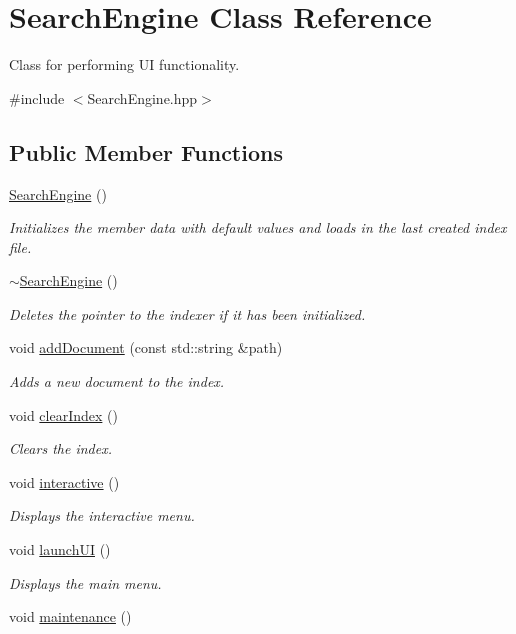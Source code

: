 \hypertarget{class_search_engine}{}\section{Search\+Engine Class Reference}
\label{class_search_engine}


Class for performing U\+I functionality.  




{\ttfamily \#include $<$Search\+Engine.\+hpp$>$}

\subsection*{Public Member Functions}
\begin{DoxyCompactItemize}
\item 
\hyperlink{class_search_engine_ab129d2c96c29c6dcf4a28abbe4168f6c}{Search\+Engine} ()
\begin{DoxyCompactList}\small\item\em Initializes the member data with default values and loads in the last created index file. \end{DoxyCompactList}\item 
\hyperlink{class_search_engine_a863ab87efd742b9a8f20b87774ab570f}{$\sim$\+Search\+Engine} ()
\begin{DoxyCompactList}\small\item\em Deletes the pointer to the indexer if it has been initialized. \end{DoxyCompactList}\item 
void \hyperlink{class_search_engine_a9ea46878a950ecad2f9f4af265ab3ace}{add\+Document} (const std\+::string \&path)
\begin{DoxyCompactList}\small\item\em Adds a new document to the index. \end{DoxyCompactList}\item 
void \hyperlink{class_search_engine_a5418e11e3626e8a72d697346051c44fd}{clear\+Index} ()
\begin{DoxyCompactList}\small\item\em Clears the index. \end{DoxyCompactList}\item 
void \hyperlink{class_search_engine_a76393f870a6ce5591b140b81df9c5fac}{interactive} ()
\begin{DoxyCompactList}\small\item\em Displays the interactive menu. \end{DoxyCompactList}\item 
void \hyperlink{class_search_engine_ac492e86eaba0b6c7c270ee88e2d6d0ab}{launch\+U\+I} ()
\begin{DoxyCompactList}\small\item\em Displays the main menu. \end{DoxyCompactList}\item 
void \hyperlink{class_search_engine_ad269ece849be36f3be5b315e0a32a120}{maintenance} ()
\end{DoxyCompactItemize}


